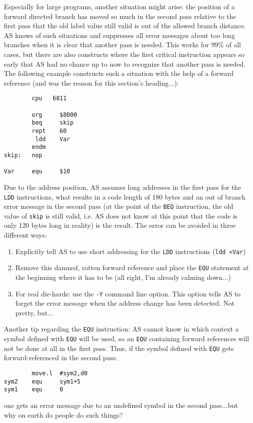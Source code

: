 \documentclass[12pt,twoside]{report}
\newcommand{\tty}[1]{{\tt #1}}
\begin{document}
Especially for large programs, another situation might arise: the
position of a forward directed branch has moved so much in the second
pass relative to the first pass that the old label value still valid
is out of the allowed branch distance.  AS knows of such situations
and suppresses all error messages about too long branches when it is
clear that another pass is needed.  This works for 99\% of all cases,
but there are also constructs where the first critical instruction
appears so early that AS had no chance up to now to recognize that
another pass is needed.  The following example constructs such a
situation with the help of a forward reference (and was the reason
for this section's heading...):
\begin{verbatim}
        cpu   6811

        org     $8000
        beq     skip
        rept    60
         ldd    Var
        endm
skip:   nop

Var     equ     $10
\end{verbatim}
Due to the address position, AS assumes long addresses in the first
pass for the \tty{LDD} instructions, what results in a code length of 180
bytes and an out of branch error message in the second pass (at the
point of the \tty{BEQ} instruction, the old value of \tty{skip} is still valid,
i.e. AS does not know at this point that the code is only 120 bytes
long in reality) is the result.  The error can be avoided in three
different ways:
\begin{enumerate}
\item{Explicitly tell AS to use short addressing for the \tty{LDD}
      instructions (\tty{ldd <Var})}
\item{Remove this damned, rotten forward reference and place the \tty{EQU}
      statement at the beginning where it has to be (all right, I'm
      already calming down...)}
\item{For real die-hards: use the \tty{-Y} command line option.  This
      option tells AS to forget the error message when the address
      change has been detected.  Not pretty, but...}
\end{enumerate}
Another tip regarding the \tty{EQU} instruction: AS cannot know in which
context a symbol defined with \tty{EQU} will be used, so an \tty{EQU} containing
forward references will not be done at all in the first pass.  Thus,
if the symbol defined with \tty{EQU} gets forward-referenced in the second
pass:
\begin{verbatim}
        move.l  #sym2,d0
sym2    equ     sym1+5
sym1    equ     0
\end{verbatim}
one gets an error message due to an undefined symbol in the second
pass...but why on earth do people do such things?
\end{document}

